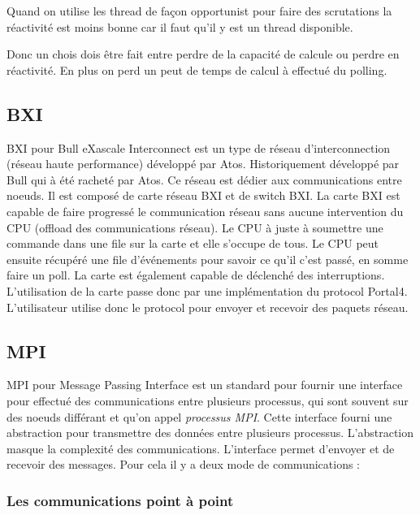 Quand on utilise les thread de façon opportunist pour faire des scrutations la réactivité est moins bonne car il faut qu'il y est un thread disponible.

Donc un chois dois être fait entre perdre de la capacité de calcule ou perdre en réactivité.
En plus on perd un peut de temps de calcul à effectué du polling.

\subsection{BXI}

BXI pour Bull eXascale Interconnect est un type de réseau d'interconnection (réseau haute performance) développé par Atos.
Historiquement développé par Bull qui à été racheté par Atos.
Ce réseau est dédier aux communications entre noeuds. Il est composé de carte réseau BXI et de switch BXI.
La carte BXI est capable de faire progressé le communication réseau sans aucune intervention du CPU (offload des communications réseau). %
Le CPU à juste à soumettre une commande dans une file sur la carte et elle s'occupe de tous.
Le CPU peut ensuite récupéré une file d'événements pour savoir ce qu'il c'est passé, en somme faire un poll.
La carte est également capable de déclenché des interruptions.
L'utilisation de la carte passe donc par une implémentation du protocol Portal4.
L'utilisateur utilise donc le protocol pour envoyer et recevoir des paquets réseau.

\subsection{MPI}

MPI pour Message Passing Interface est un standard pour fournir une interface pour effectué des communications entre plusieurs processus, qui sont souvent sur des noeuds différant et qu'on appel \emph{processus MPI}.
Cette interface fourni une abstraction pour transmettre des données entre plusieurs processus.
L'abstraction masque la complexité des communications.
L'interface permet d'envoyer et de recevoir des messages. Pour cela il y a deux mode de communications :

\subsubsection{Les communications point à point}

